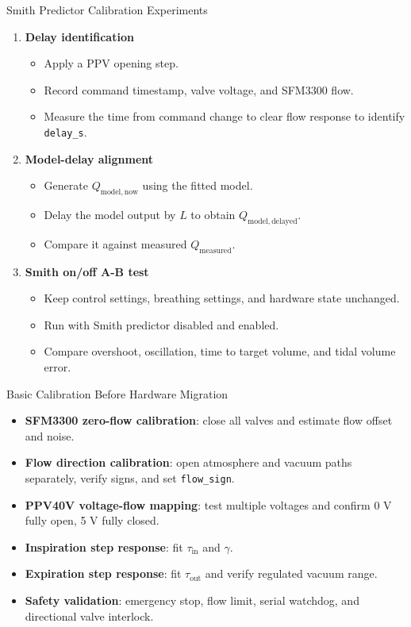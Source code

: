 \documentclass[aspectratio=169,10pt]{beamer}
\newcommand{\code}[1]{\texttt{\small #1}}
\begin{document}
\begin{frame}[shrink=5]{Smith Predictor Calibration Experiments}
  \begin{enumerate}
    \item \textbf{Delay identification}
      \begin{itemize}
        \item Apply a PPV opening step.
        \item Record command timestamp, valve voltage, and SFM3300 flow.
        \item Measure the time from command change to clear flow response to identify \code{delay\_s}.
      \end{itemize}

    \item \textbf{Model-delay alignment}
      \begin{itemize}
        \item Generate $Q_{\mathrm{model,now}}$ using the fitted model.
        \item Delay the model output by $L$ to obtain $Q_{\mathrm{model,delayed}}$.
        \item Compare it against measured $Q_{\mathrm{measured}}$.
      \end{itemize}

    \item \textbf{Smith on/off A-B test}
      \begin{itemize}
        \item Keep control settings, breathing settings, and hardware state unchanged.
        \item Run with Smith predictor disabled and enabled.
        \item Compare overshoot, oscillation, time to target volume, and tidal volume error.
      \end{itemize}
  \end{enumerate}
\end{frame}

\begin{frame}{Basic Calibration Before Hardware Migration}
  \begin{itemize}
    \item \textbf{SFM3300 zero-flow calibration}: close all valves and estimate flow offset and noise.
    \item \textbf{Flow direction calibration}: open atmosphere and vacuum paths separately, verify signs, and set \code{flow\_sign}.
    \item \textbf{PPV40V voltage-flow mapping}: test multiple voltages and confirm 0 V fully open, 5 V fully closed.
    \item \textbf{Inspiration step response}: fit $\tau_{\mathrm{in}}$ and $\gamma$.
    \item \textbf{Expiration step response}: fit $\tau_{\mathrm{out}}$ and verify regulated vacuum range.
    \item \textbf{Safety validation}: emergency stop, flow limit, serial watchdog, and directional valve interlock.
  \end{itemize}
\end{frame}
\end{document}
